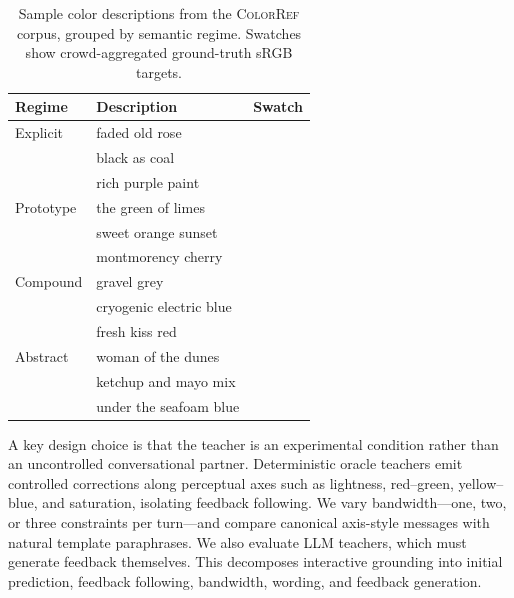 \documentclass[11pt]{article}
\begin{document}
\begin{table}[t]
\centering
\small
\begin{tabular}{@{}lll@{}}
\toprule
Regime & Description & Swatch \\
\midrule
Explicit & faded old rose &
\cellcolor[HTML]{D2917A}\phantom{xxxx} \\
& black as coal &
\cellcolor[HTML]{1F2829}\phantom{xxxx} \\
& rich purple paint &
\cellcolor[HTML]{706CC9}\phantom{xxxx} \\
\midrule
Prototype & the green of limes &
\cellcolor[HTML]{65C204}\phantom{xxxx} \\
& sweet orange sunset &
\cellcolor[HTML]{F0991A}\phantom{xxxx} \\
& montmorency cherry &
\cellcolor[HTML]{E13D2B}\phantom{xxxx} \\
\midrule
Compound & gravel grey &
\cellcolor[HTML]{8F887C}\phantom{xxxx} \\
& cryogenic electric blue &
\cellcolor[HTML]{1926FF}\phantom{xxxx} \\
& fresh kiss red &
\cellcolor[HTML]{D33750}\phantom{xxxx} \\
\midrule
 Abstract & woman of the dunes &
\cellcolor[HTML]{66615E}\phantom{xxxx} \\
& ketchup and mayo mix &
\cellcolor[HTML]{F3AC88}\phantom{xxxx} \\
& under the seafoam blue &
\cellcolor[HTML]{47A8AB}\phantom{xxxx} \\
\bottomrule
\end{tabular}
\caption{
Sample color descriptions from the \textsc{ColorRef} corpus, grouped by
semantic regime. Swatches show crowd-aggregated ground-truth sRGB targets.
}
\label{tab:colorref_swatch_examples}
\end{table}

A key design choice is that the teacher is an experimental condition rather
than an uncontrolled conversational partner. Deterministic oracle teachers
emit controlled corrections along perceptual axes such as lightness,
red--green, yellow--blue, and saturation, isolating feedback following. We
vary bandwidth---one, two, or three constraints per turn---and compare
canonical axis-style messages with natural template paraphrases. We also
evaluate LLM teachers, which must generate feedback themselves. This
decomposes interactive grounding into initial prediction, feedback following,
bandwidth, wording, and feedback generation.
\end{document}
